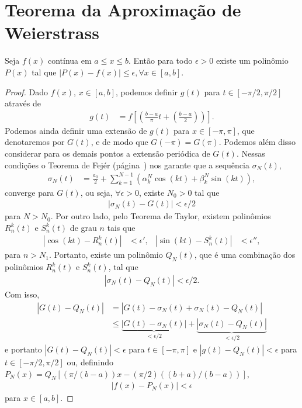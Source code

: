\section{Teorema da Aproxima\c{c}\~{a}o de Weierstrass}
\begin{teo}
    Seja $f(x)$ cont\'{i}nua em $a \leq x \leq b$. Ent\~{a}o para todo $\epsilon > 0$ existe um polin\^{o}mio $P(x)$ tal que $|P(x) - f(x)| \leq \epsilon, \forall x \in [a,b]$.
\end{teo}
\begin{proof}
    Dado $f(x)$, $x \in [a,b]$, podemos definir $g(t)$ para $t \in [-\pi/2, \pi/2]$ atrav\'{e}s de
    \begin{align*}
        g(t) &= f\left[ \left( \frac{b - a}{\pi} t + \left( \frac{b - a}{2} \right) \right) \right].
    \end{align*}
    Podemos ainda definir uma extens\~{a}o de $g(t)$ para $x \in [-\pi, \pi]$, que denotaremos por $G(t)$, e de modo que $G(-\pi) = G(\pi)$. Podemos al\'{e}m disso considerar para os demais pontos a extens\~{a}o peri\'{o}dica de $G(t)$. Nessas condi\c{c}\~{o}es o Teorema de Fej\'{e}r (p\'{a}gina~\pageref{teo:fejer}) nos garante que a sequ\^{e}ncia $\sigma_N(t)$,
    \begin{align*}
        \sigma_N(t) &= \frac{a_0}{2} + \sum_{k = 1}^{N - 1} \left( \alpha_k^N \cos\left( k t \right) + \beta_k^N \sin\left( k t \right) \right),
    \end{align*}
    converge para $G(t)$, ou seja, $\forall \epsilon > 0$, existe $N_0 > 0$ tal que
    \begin{align*}
        | \sigma_N(t) - G(t) | < \epsilon/2
    \end{align*}
    para $N > N_0$. Por outro lado, pelo Teorema de Taylor, existem polin\^{o}mios $R_n^k(t)$ e $S_n^k(t)$ de grau $n$ tais que
    \begin{align*}
        | \cos\left( k t \right) - R_n^k(t) | &< \epsilon', & | \sin\left( k t \right) - S_n^k(t) | &< \epsilon'',
    \end{align*}
    para $n > N_1$. Portanto, existe um polin\^{o}mio $Q_N(t)$, que \'{e} uma combina\c{c}\~{a}o dos polin\^{o}mios $R_n^k(t)$ e $S_n^k(t)$, tal que
    \begin{align*}
        | \sigma_N(t) - Q_N(t) | < \epsilon/2.
    \end{align*}
    Com isso,
    \begin{align*}
        | G(t) - Q_N(t) | &= | G(t) - \sigma_N(t) + \sigma_N(t) - Q_N(t) | \\
        &\leq \underbrace{| G(t) - \sigma_N(t) |}_{< \epsilon/2} + \underbrace{| \sigma_N(t) - Q_N(t) |}_{< \epsilon/2}
    \end{align*}
    e portanto $| G(t) - Q_N(t) | < \epsilon$ para $t \in [-\pi, \pi]$ e $| g(t) - Q_N(t) | < \epsilon$ para $t \in [-\pi/2, \pi/2]$ ou, definindo $P_N(x) = Q_N\left[ \left( \pi / \left( b - a \right) \right) x - \left( \pi / 2 \right) \left( \left( b + a \right) / \left( b - a \right) \right) \right]$,
    \begin{align*}
        | f(x) - P_N(x) | < \epsilon
    \end{align*}
    para $x \in [a, b]$.
\end{proof}


